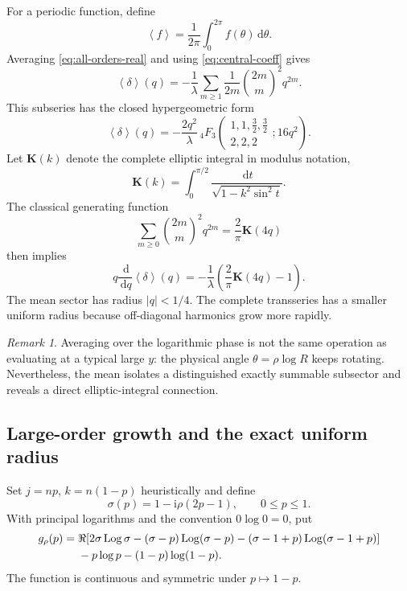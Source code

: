 \documentclass[11pt,oneside]{article}
\numberwithin{equation}{section}
\theoremstyle{plain}
\theoremstyle{definition}
\theoremstyle{remark}
\newtheorem{remark}[theorem]{Remark}
\newcommand{\ii}{\mathrm i}
\newcommand{\dd}{\,\mathrm d}
\newcommand{\Logp}{\operatorname{Log}}
\newcommand{\mean}[1]{\left\langle #1\right\rangle}
\begin{document}
For a periodic function, define
\begin{equation}\label{eq:angular-mean}
 \mean{f}=\frac1{2\pi}\int_0^{2\pi}f(\theta)\dd\theta.
\end{equation}
Averaging \cref{eq:all-orders-real} and using
\cref{eq:central-coeff} gives
\begin{equation}\label{eq:mean-series}
 \mean{\delta}(q)
 =-\frac1\lambda\sum_{m\ge1}
 \frac1{2m}\binom{2m}{m}^2q^{2m}.
\end{equation}
This subseries has the closed hypergeometric form
\begin{equation}\label{eq:mean-4F3}
 \boxed{
 \mean{\delta}(q)=
 -\frac{2q^2}{\lambda}\,
 {}_4F_3\!\left(
 \begin{matrix}1,1,\tfrac32,\tfrac32\\2,2,2\end{matrix};16q^2
 \right).
 }
\end{equation}
Let \(\mathbf K(k)\) denote the complete elliptic integral in modulus
notation,
\begin{equation}\label{eq:K-modulus}
 \mathbf K(k)=\int_0^{\pi/2}
 \frac{\dd t}{\sqrt{1-k^2\sin^2t}}.
\end{equation}
The classical generating function
\begin{equation}\label{eq:central-square-K}
 \sum_{m\ge0}\binom{2m}{m}^2q^{2m}
 =\frac2\pi\mathbf K(4q)
\end{equation}
then implies
\begin{equation}\label{eq:mean-derivative-K}
 q\frac{\dd}{\dd q}\mean{\delta}(q)
 =-\frac1\lambda\left(\frac2\pi\mathbf K(4q)-1\right).
\end{equation}
The mean sector has radius \(|q|<1/4\).  The complete transseries has a
smaller uniform radius because off-diagonal harmonics grow more rapidly.

\begin{remark}
Averaging over the logarithmic phase is not the same operation as evaluating
at a typical large \(y\): the physical angle \(\theta=\rho\log R\) keeps
rotating.  Nevertheless, the mean isolates a distinguished exactly
summable subsector and reveals a direct elliptic-integral connection.
\end{remark}

\subsection{Large-order growth and the exact uniform radius}

Set \(j=np\), \(k=n(1-p)\) heuristically and define
\begin{equation}\label{eq:sigma-p}
 \sigma(p)=1-\ii\rho(2p-1),
 \qquad 0\le p\le1.
\end{equation}
With principal logarithms and the convention \(0\log0=0\), put
\begin{align}
 g_\rho(p)={}&\Re\!\left[
 2\sigma\Logp\sigma
 -(\sigma-p)\Logp(\sigma-p)
 -(\sigma-1+p)\Logp(\sigma-1+p)
 \right]
 \notag\\
 &-p\log p-(1-p)\log(1-p).
 \label{eq:g-rho}
\end{align}
The function is continuous and symmetric under \(p\mapsto1-p\).
\end{document}
